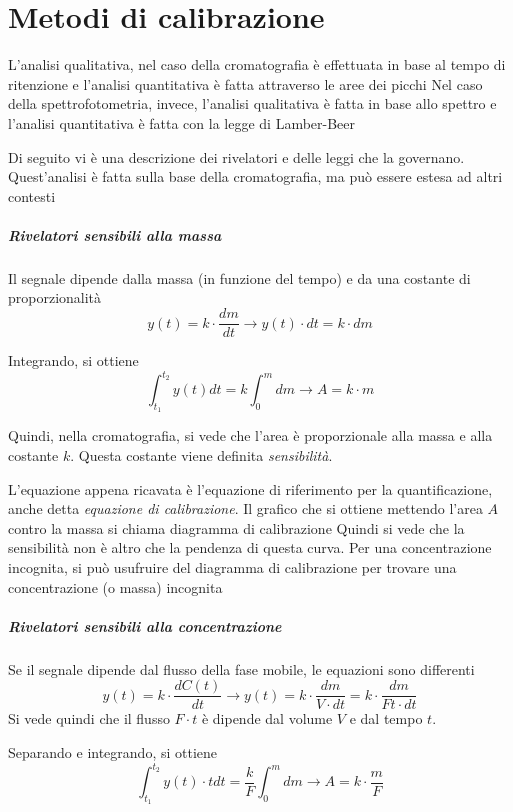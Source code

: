 \chapter{Metodi di calibrazione}

L'analisi qualitativa, nel caso della cromatografia è effettuata in base al tempo di ritenzione e l'analisi quantitativa è fatta attraverso le aree dei picchi
Nel caso della spettrofotometria, invece, l'analisi qualitativa è fatta in base allo spettro e l'analisi quantitativa è fatta con la legge di Lamber-Beer

Di seguito vi è una descrizione dei rivelatori e delle leggi che la governano. Quest'analisi è fatta sulla base della cromatografia, ma può essere estesa ad altri contesti

\paragraph{Rivelatori sensibili alla massa}
Il segnale dipende dalla massa (in funzione del tempo) e da una costante di proporzionalità
\[
y(t) = k \cdot \frac{dm}{dt} \rightarrow y(t) \cdot dt = k \cdot dm
\]

Integrando, si ottiene
\[
\int_{t_1}^{t_2} y(t) dt = k \int_0^m dm \rightarrow A = k \cdot m
\]

Quindi, nella cromatografia, si vede che l'area è proporzionale alla massa e alla costante $k$.
Questa costante viene definita \emph{sensibilità}.

L'equazione appena ricavata è l'equazione di riferimento per la quantificazione, anche detta \emph{equazione di calibrazione}.
Il grafico che si ottiene mettendo l'area $A$ contro la massa si chiama diagramma di calibrazione
Quindi si vede che la sensibilità non è altro che la pendenza di questa curva.
Per una concentrazione incognita, si può usufruire del diagramma di calibrazione per trovare una concentrazione (o massa) incognita

\paragraph{Rivelatori sensibili alla concentrazione}
Se il segnale dipende dal flusso della fase mobile, le equazioni sono differenti
\[
y(t) = k \cdot \frac{d C(t)}{dt} \rightarrow y(t) = k \cdot \frac{dm}{V \cdot dt} = k \cdot \frac{dm}{F t \cdot dt}
\]
Si vede quindi che il flusso $F \cdot t$ è dipende dal volume $V$ e dal tempo $t$.

Separando e integrando, si ottiene
\[
\int_{t_1}^{t_2} y(t) \cdot t dt = \frac{k}{F} \int_0^m dm \rightarrow A = k \cdot \frac{m}{F}
\]

